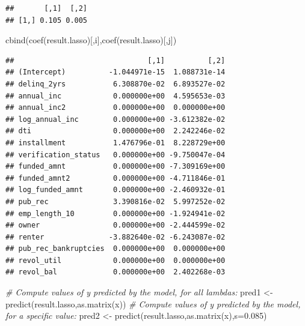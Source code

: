 \documentclass[
  12pt,
]{book}
\newenvironment{Shaded}{\begin{snugshade}}{\end{snugshade}}
\newcommand{\AttributeTok}[1]{\textcolor[rgb]{0.77,0.63,0.00}{#1}}
\newcommand{\CommentTok}[1]{\textcolor[rgb]{0.56,0.35,0.01}{\textit{#1}}}
\newcommand{\DecValTok}[1]{\textcolor[rgb]{0.00,0.00,0.81}{#1}}
\newcommand{\FloatTok}[1]{\textcolor[rgb]{0.00,0.00,0.81}{#1}}
\newcommand{\FunctionTok}[1]{\textcolor[rgb]{0.00,0.00,0.00}{#1}}
\newcommand{\NormalTok}[1]{#1}
\newcommand{\OtherTok}[1]{\textcolor[rgb]{0.56,0.35,0.01}{#1}}
\newcommand{\SpecialCharTok}[1]{\textcolor[rgb]{0.00,0.00,0.00}{#1}}
\theoremstyle{definition}
\theoremstyle{definition}
\theoremstyle{definition}
\theoremstyle{definition}
\theoremstyle{remark}
\begin{document}
\begin{Shaded}
\end{Shaded}

\begin{verbatim}
##       [,1]  [,2]
## [1,] 0.105 0.005
\end{verbatim}

\begin{Shaded}
\begin{Highlighting}[]
\FunctionTok{cbind}\NormalTok{(}\FunctionTok{coef}\NormalTok{(result.lasso)[,i],}\FunctionTok{coef}\NormalTok{(result.lasso)[,j])}
\end{Highlighting}
\end{Shaded}

\begin{verbatim}
##                               [,1]          [,2]
## (Intercept)          -1.044971e-15  1.088731e-14
## delinq_2yrs           6.308870e-02  6.893527e-02
## annual_inc            0.000000e+00  4.595653e-03
## annual_inc2           0.000000e+00  0.000000e+00
## log_annual_inc        0.000000e+00 -3.612382e-02
## dti                   0.000000e+00  2.242246e-02
## installment           1.476796e-01  8.228729e+00
## verification_status   0.000000e+00 -9.750047e-04
## funded_amnt           0.000000e+00 -7.309169e+00
## funded_amnt2          0.000000e+00 -4.711846e-01
## log_funded_amnt       0.000000e+00 -2.460932e-01
## pub_rec               3.390816e-02  5.997252e-02
## emp_length_10         0.000000e+00 -1.924941e-02
## owner                 0.000000e+00 -2.444599e-02
## renter               -3.882640e-02 -6.243087e-02
## pub_rec_bankruptcies  0.000000e+00  0.000000e+00
## revol_util            0.000000e+00  0.000000e+00
## revol_bal             0.000000e+00  2.402268e-03
\end{verbatim}

\begin{Shaded}
\begin{Highlighting}[]
\CommentTok{\# Compute values of y predicted by the model, for all lambdas:}
\NormalTok{pred1 }\OtherTok{\textless{}{-}} \FunctionTok{predict}\NormalTok{(result.lasso,}\FunctionTok{as.matrix}\NormalTok{(x))}
\CommentTok{\# Compute values of y predicted by the model, for a specific value:}
\NormalTok{pred2 }\OtherTok{\textless{}{-}} \FunctionTok{predict}\NormalTok{(result.lasso,}\FunctionTok{as.matrix}\NormalTok{(x),}\AttributeTok{s=}\FloatTok{0.085}\NormalTok{)}
\end{Highlighting}
\end{Shaded}
\end{document}
